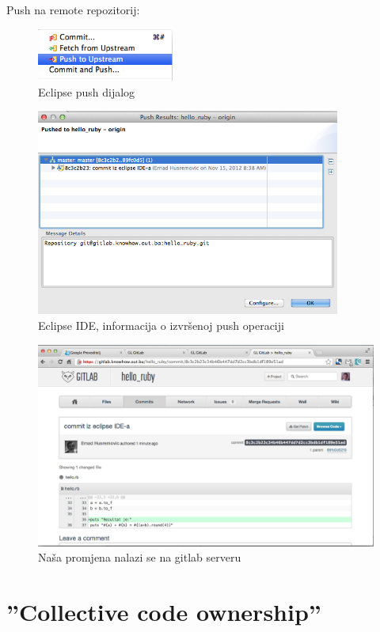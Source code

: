 \documentclass[times, utf8, seminar]{fit}
\begin{document}
\begin{itemize}
Push na remote repozitorij:

\begin{figure}[H]
\centering
\includegraphics[width=4.5cm]{img/eclipse_git_04.png}
\caption{Eclipse push dijalog}
\end{figure}

\begin{figure}[H]
\centering
\includegraphics[width=10cm]{img/eclipse_git_05.png}
\caption{Eclipse IDE, informacija o izvršenoj push operaciji}
\end{figure}

\begin{figure}[H]
\centering
\includegraphics[width=15cm]{img/eclipse_git_06.png}
\caption{Naša promjena nalazi se na gitlab serveru}
\end{figure}

\section{''Collective code ownership''}


\end{itemize}
\end{document}
